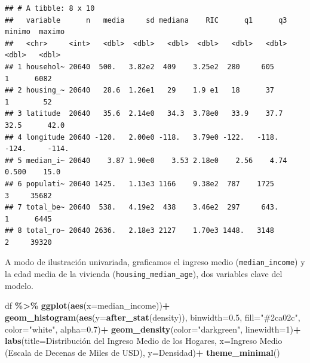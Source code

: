 \documentclass[
]{book}
\newenvironment{Shaded}{\begin{snugshade}}{\end{snugshade}}
\newcommand{\AttributeTok}[1]{\textcolor[rgb]{0.13,0.29,0.53}{#1}}
\newcommand{\DecValTok}[1]{\textcolor[rgb]{0.00,0.00,0.81}{#1}}
\newcommand{\FloatTok}[1]{\textcolor[rgb]{0.00,0.00,0.81}{#1}}
\newcommand{\FunctionTok}[1]{\textcolor[rgb]{0.13,0.29,0.53}{\textbf{#1}}}
\newcommand{\NormalTok}[1]{#1}
\newcommand{\SpecialCharTok}[1]{\textcolor[rgb]{0.81,0.36,0.00}{\textbf{#1}}}
\newcommand{\StringTok}[1]{\textcolor[rgb]{0.31,0.60,0.02}{#1}}
\begin{document}
\begin{verbatim}
## # A tibble: 8 x 10
##   variable      n   media     sd mediana    RIC      q1      q3   minimo  maximo
##   <chr>     <int>   <dbl>  <dbl>   <dbl>  <dbl>   <dbl>   <dbl>    <dbl>   <dbl>
## 1 househol~ 20640  500.   3.82e2  409    3.25e2  280     605       1      6082  
## 2 housing_~ 20640   28.6  1.26e1   29    1.9 e1   18      37       1        52  
## 3 latitude  20640   35.6  2.14e0   34.3  3.78e0   33.9    37.7    32.5      42.0
## 4 longitude 20640 -120.   2.00e0 -118.   3.79e0 -122.   -118.   -124.     -114. 
## 5 median_i~ 20640    3.87 1.90e0    3.53 2.18e0    2.56    4.74    0.500    15.0
## 6 populati~ 20640 1425.   1.13e3 1166    9.38e2  787    1725       3     35682  
## 7 total_be~ 20640  538.   4.19e2  438    3.46e2  297     643.      1      6445  
## 8 total_ro~ 20640 2636.   2.18e3 2127    1.70e3 1448.   3148       2     39320
\end{verbatim}

A modo de ilustración univariada, graficamos el ingreso medio (\texttt{median\_income}) y la edad media de la vivienda (\texttt{housing\_median\_age}), dos variables clave del modelo.

\begin{Shaded}
\begin{Highlighting}[]
\NormalTok{df }\SpecialCharTok{\%\textgreater{}\%} 
  \FunctionTok{ggplot}\NormalTok{(}\FunctionTok{aes}\NormalTok{(}\AttributeTok{x=}\NormalTok{median\_income))}\SpecialCharTok{+}
  \FunctionTok{geom\_histogram}\NormalTok{(}\FunctionTok{aes}\NormalTok{(}\AttributeTok{y=}\FunctionTok{after\_stat}\NormalTok{(density)), }\AttributeTok{binwidth=}\FloatTok{0.5}\NormalTok{, }\AttributeTok{fill=}\StringTok{"\#2ca02c"}\NormalTok{, }\AttributeTok{color=}\StringTok{"white"}\NormalTok{, }\AttributeTok{alpha=}\FloatTok{0.7}\NormalTok{)}\SpecialCharTok{+}
  \FunctionTok{geom\_density}\NormalTok{(}\AttributeTok{color=}\StringTok{"darkgreen"}\NormalTok{, }\AttributeTok{linewidth=}\DecValTok{1}\NormalTok{)}\SpecialCharTok{+}
  \FunctionTok{labs}\NormalTok{(}\AttributeTok{title=}\StringTok{\textquotesingle{}Distribución del Ingreso Medio de los Hogares\textquotesingle{}}\NormalTok{,}
       \AttributeTok{x=}\StringTok{\textquotesingle{}Ingreso Medio (Escala de Decenas de Miles de USD)\textquotesingle{}}\NormalTok{,}
       \AttributeTok{y=}\StringTok{\textquotesingle{}Densidad\textquotesingle{}}\NormalTok{)}\SpecialCharTok{+}
  \FunctionTok{theme\_minimal}\NormalTok{()}
\end{Highlighting}
\end{Shaded}
\end{document}
